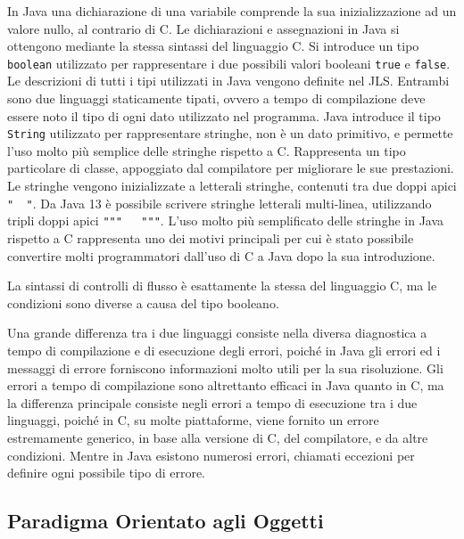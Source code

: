 \documentclass{article}
\numberwithin{equation}{subsection}
\begin{document}
In Java una dichiarazione di una variabile comprende la sua inizializzazione ad un valore nullo, al contrario di C. Le dichiarazioni e assegnazioni in Java si ottengono mediante la stessa 
sintassi del linguaggio C. Si introduce un tipo \verb|boolean| utilizzato per rappresentare i due possibili valori booleani \verb|true| e \verb|false|. Le descrizioni di 
tutti i tipi utilizzati in Java vengono definite nel JLS. Entrambi sono due linguaggi staticamente tipati, ovvero a tempo di compilazione deve essere noto il tipo di ogni 
dato utilizzato nel programma. 
Java introduce il tipo \verb|String| utilizzato per rappresentare stringhe, non è un dato primitivo, e permette l'uso molto più semplice delle stringhe rispetto a C. Rappresenta 
un tipo particolare di classe, appoggiato dal compilatore per migliorare le sue prestazioni. Le stringhe vengono inizializzate a letterali stringhe, 
contenuti tra due doppi apici \verb|"  "|. Da Java 13 è possibile scrivere stringhe letterali multi-linea, utilizzando tripli doppi apici \verb|"""   """|. 
L'uso molto più semplificato delle stringhe in Java rispetto a C rappresenta uno dei motivi principali per cui è stato possibile convertire molti programmatori dall'uso di C a Java dopo la 
sua introduzione. 

La sintassi di controlli di flusso è esattamente la stessa del linguaggio C, ma le condizioni sono diverse a causa del tipo booleano. 

Una grande differenza tra i due linguaggi consiste nella diversa diagnostica a tempo di compilazione e di esecuzione degli errori, poiché in Java gli errori ed i messaggi 
di errore forniscono informazioni molto utili per la sua risoluzione. 
Gli errori a tempo di compilazione sono altrettanto efficaci in Java quanto in C, ma  la differenza principale consiste negli errori a tempo di esecuzione tra i due linguaggi, 
poiché in C, su molte piattaforme, viene fornito un errore estremamente generico, in base alla versione di C, del compilatore, e da altre condizioni. 
Mentre in Java esistono numerosi errori, chiamati eccezioni per definire ogni possibile tipo di errore. 

\subsection{Paradigma Orientato agli Oggetti}
\end{document}
